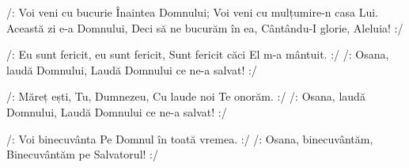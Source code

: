\beginverse
/: Voi veni cu bucurie
Înaintea Domnului;
Voi veni cu mulțumire-n casa Lui.
Această zi e-a Domnului,
Deci să ne bucurăm în ea,
Cântându-I glorie, Aleluia! :/
\endverse

\beginverse
/: Eu sunt fericit, eu sunt fericit,
Sunt fericit căci El m-a mântuit. :/
/: Osana, laudă Domnului,
Laudă Domnului ce ne-a salvat! :/
\endverse

\beginverse
/: Măreț ești, Tu, Dumnezeu,
Cu laude noi Te onorăm. :/
/: Osana, laudă Domnului,
Laudă Domnului ce ne-a salvat! :/
\endverse

\beginverse
/: Voi binecuvânta
Pe Domnul în toată vremea. :/
/: Osana, binecuvântăm,
Binecuvântăm pe Salvatorul! :/
\endverse
\endsong